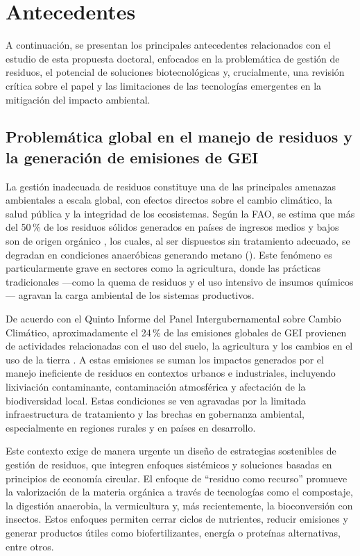 \chapter{Antecedentes}

A continuación, se presentan los principales antecedentes relacionados con el estudio de esta propuesta doctoral, enfocados en la problemática de gestión de residuos, el potencial de soluciones biotecnológicas y, crucialmente, una revisión crítica sobre el papel y las limitaciones de las tecnologías emergentes en la mitigación del impacto ambiental.

\section{Problemática global en el manejo de residuos y la generación de emisiones de GEI}

La gestión inadecuada de residuos constituye una de las principales amenazas ambientales a escala global, con efectos directos sobre el cambio climático, la salud pública y la integridad de los ecosistemas. Según la FAO, se estima que más del 50\,\% de los residuos sólidos generados en países de ingresos medios y bajos son de origen orgánico \parencite{lacknerAgriculturalWasteChallenges2025}, los cuales, al ser dispuestos sin tratamiento adecuado, se degradan en condiciones anaeróbicas generando metano (). Este fenómeno es particularmente grave en sectores como la agricultura, donde las prácticas tradicionales —como la quema de residuos y el uso intensivo de insumos químicos— agravan la carga ambiental de los sistemas productivos.

De acuerdo con el Quinto Informe del Panel Intergubernamental sobre Cambio Climático, aproximadamente el 24\,\% de las emisiones globales de GEI provienen de actividades relacionadas con el uso del suelo, la agricultura y los cambios en el uso de la tierra \parencite{groupedexpertsintergouvernementalsurlevolutionduclimatClimateChange20142014}. A estas emisiones se suman los impactos generados por el manejo ineficiente de residuos en contextos urbanos e industriales, incluyendo lixiviación contaminante, contaminación atmosférica y afectación de la biodiversidad local. Estas condiciones se ven agravadas por la limitada infraestructura de tratamiento y las brechas en gobernanza ambiental, especialmente en regiones rurales y en países en desarrollo.

Este contexto exige de manera urgente un diseño de estrategias sostenibles de gestión de residuos, que integren enfoques sistémicos y soluciones basadas en principios de economía circular. El enfoque de “residuo como recurso” promueve la valorización de la materia orgánica a través de tecnologías como el compostaje, la digestión anaerobia, la vermicultura y, más recientemente, la bioconversión con insectos. Estos enfoques permiten cerrar ciclos de nutrientes, reducir emisiones y generar productos útiles como biofertilizantes, energía o proteínas alternativas, entre otros.

